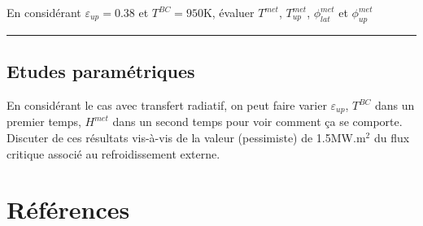 \documentclass[3p]{elsarticle}
\newenvironment{remark}[1][\textit{Nota Bene}]{\begin{trivlist}
\item[\hskip \labelsep {\bfseries \rule{1ex}{1ex} #1}]\ignorespaces}{\rule{1ex}{1ex} \end{trivlist}\ignorespacesafterend}
\newcounter{question}
\newcommand{\Q}[1]{\stepcounter{question}\begin{remark}[Q\arabic{question}]#1~~\end{remark}}
\begin{document}
\Q{En considérant $\varepsilon_{up} = 0.38$ et $T^{BC}=950$K, évaluer \(T^{met}\), \(T_{up}^{met}\), \(\phi_{lat}^{met}\) et \(\phi_{up}^{met}\)}

\subsection{Etudes paramétriques} \label{sect:param}

En considérant le cas avec transfert radiatif, on peut faire varier $\varepsilon_{up}$, $T^{BC}$ dans un premier temps, $H^{met}$ dans un second temps pour voir comment ça se comporte. Discuter de ces résultats vis-à-vis de la valeur (pessimiste) de 1.5MW.m$^2$ du flux critique associé au refroidissement externe.

\section*{Références}


\end{document}
